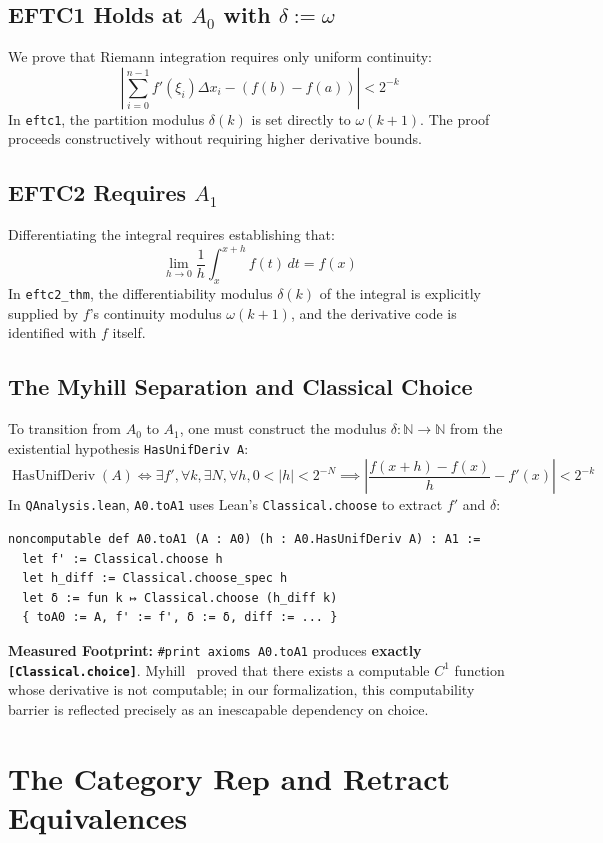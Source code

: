 \documentclass[11pt,a4paper]{article}
\theoremstyle{definition}
\theoremstyle{remark}
\newcommand{\Rep}{\ensuremath{\mathbf{Rep}}}
\newcommand{\N}{\ensuremath{\mathbb{N}}}
\begin{document}
\subsection{EFTC1 Holds at $A_0$ with $\delta := \omega$}
We prove that Riemann integration requires only uniform continuity:
\[
\left| \sum_{i=0}^{n-1} f'(\xi_i) \Delta x_i - (f(b) - f(a)) \right| < 2^{-k}
\]
In \texttt{eftc1}, the partition modulus $\delta(k)$ is set directly to $\omega(k+1)$. The proof proceeds constructively without requiring higher derivative bounds.

\subsection{EFTC2 Requires $A_1$}
Differentiating the integral requires establishing that:
\[
\lim_{h \to 0} \frac{1}{h} \int_x^{x+h} f(t) \, dt = f(x)
\]
In \texttt{eftc2\_thm}, the differentiability modulus $\delta(k)$ of the integral is explicitly supplied by $f$'s continuity modulus $\omega(k+1)$, and the derivative code is identified with $f$ itself.

\subsection{The Myhill Separation and Classical Choice}
To transition from $A_0$ to $A_1$, one must construct the modulus $\delta : \N \to \N$ from the existential hypothesis \texttt{HasUnifDeriv A}:
\[
\operatorname{HasUnifDeriv}(A) \iff \exists f', \forall k, \exists N, \forall h, 0 < |h| < 2^{-N} \implies \left| \frac{f(x+h)-f(x)}{h} - f'(x) \right| < 2^{-k}
\]
In \texttt{QAnalysis.lean}, \texttt{A0.toA1} uses Lean's \texttt{Classical.choose} to extract $f'$ and $\delta$:
\begin{lstlisting}[language=Lean]
noncomputable def A0.toA1 (A : A0) (h : A0.HasUnifDeriv A) : A1 :=
  let f' := Classical.choose h
  let h_diff := Classical.choose_spec h
  let δ := fun k ↦ Classical.choose (h_diff k)
  { toA0 := A, f' := f', δ := δ, diff := ... }
\end{lstlisting}
\textbf{Measured Footprint:} \texttt{\#print axioms A0.toA1} produces \textbf{exactly \texttt{[Classical.choice]}}. Myhill~\cite{myhill1971} proved that there exists a computable $C^1$ function whose derivative is not computable; in our formalization, this computability barrier is reflected precisely as an inescapable dependency on choice.

\section{The Category $\Rep$ and Retract Equivalences}
\end{document}
